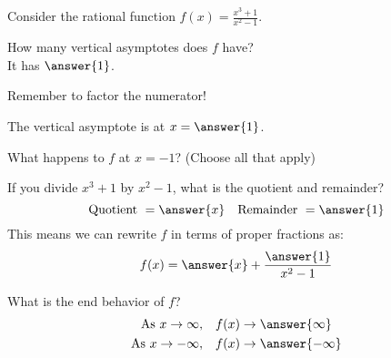 \documentclass{ximera}
\author{Carl Stitz \and Jeff Zeager \and  Bobby Ramsey}
\begin{document}
Consider the rational function $\displaystyle f(x) = \frac{x^3+1}{x^2-1}$.

\begin{exercise}
	How many vertical asymptotes does $f$ have? \\
	
	It has $\answer{1}$.

	\begin{feedback}
		Remember to factor the numerator!
	\end{feedback}	
	\begin{exercise}
		The vertical asymptote is at $x = \answer{1}$.
		\begin{exercise}
			What happens to $f$ at $x=-1$? (Choose all that apply)
			\begin{selectAll}
			\end{selectAll}
		\end{exercise}	
	\end{exercise}
\end{exercise}
	
\begin{exercise}
	If you divide $x^3+1$ by $x^2-1$, what is the quotient and remainder?
	\[\text{Quotient} \,\, = \answer{x} \quad \text{Remainder} \,\, = \answer{1}\]
	This means we can rewrite $f$ in terms of proper fractions as:
	\[ f(x) = \answer{x} + \frac{\answer{1}}{x^2-1} \]
	\begin{exercise}
		What is the end behavior of $f$?
		\begin{align*}
			\text{As} \,\, x \to \infty, &\quad f(x) \to \answer{\infty}\\
			\text{As} \,\, x \to -\infty, &\quad f(x) \to \answer{-\infty}\\
		\end{align*}	
	\end{exercise}	
\end{exercise}
	
\end{document}
